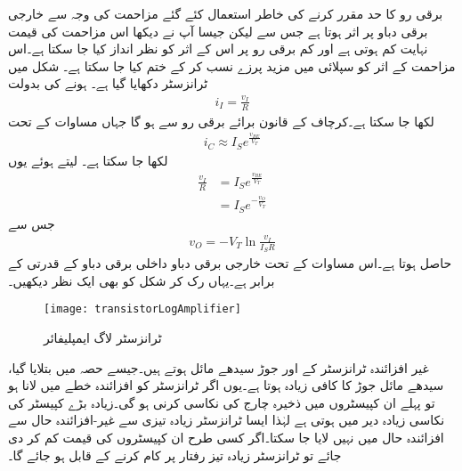 برقی رو کا حد مقرر کرنے کی خاطر استعمال کئے گئے مزاحمت  کی وجہ سے خارجی برقی دباو   پر اثر ہوتا ہے جس سے  لیکن جیسا آپ نے دیکھا اس مزاحمت کی قیمت نہایت کم ہوتی ہے اور کم برقی رو پر اس کے اثر کو نظر انداز کیا جا سکتا ہے۔اس مزاحمت کے اثر کو سپلائی میں مزید پرزے نسب کر کے ختم کیا جا سکتا ہے۔
شکل  میں ٹرانزسٹر  دکھایا گیا ہے۔ ہونے کی بدولت
\begin{align*}
i_I=\frac{v_I}{R}
\end{align*}
لکھا جا سکتا ہے۔کرچاف کے قانون برائے برقی رو سے  ہو گا جہاں مساوات  کے تحت
\begin{align*}
i_C \approx I_S e^{\frac{v_{BE}}{V_T}}
\end{align*}
لکھا جا سکتا ہے۔ لیتے ہوئے یوں
\begin{align*}
\frac{v_I}{R}&=I_S e^{\frac{v_{BE}}{V_T}}\\
&=I_S e^{-\frac{v_{O}}{V_T}}
\end{align*}
جس سے
\begin{align}
v_O=-V_T \ln \frac{v_I}{I_S R}
\end{align}
حاصل ہوتا ہے۔اس مساوات کے تحت خارجی برقی دباو  داخلی برقی دباو کے قدرتی  کے برابر ہے۔یہاں رک کر شکل  کو بھی ایک نظر دیکھیں۔
%
\begin{figure}
\centering
\texttt{[image: transistorLogAmplifier]}
\caption{ٹرانزسٹر لاگ ایمپلیفائر}
\label{شکل_ٹرانزسٹر_لاگ_ایمپلیفائر}
\end{figure}
غیر افزائندہ ٹرانزسٹر کے  اور  جوڑ سیدھے مائل ہوتے ہیں۔جیسے حصہ  میں بتلایا گیا، سیدھے مائل  جوڑ کا  کافی زیادہ ہوتا ہے۔یوں اگر ٹرانزسٹر کو افزائندہ خطے میں لانا ہو تو پہلے ان کپیسٹروں میں ذخیرہ چارج کی نکاسی کرنی ہو گی۔زیادہ بڑے کپیسٹر کی نکاسی زیادہ دیر میں ہوتی ہے لہٰذا ایسا ٹرانزسٹر زیادہ تیزی سے غیر-افزائندہ حال سے افزائندہ حال میں نہیں لایا جا سکتا۔اگر کسی طرح ان کپیسٹروں کی قیمت کم کر دی جائے تو ٹرانزسٹر زیادہ تیز رفتار پر کام کرنے کے قابل ہو جائے گا۔


